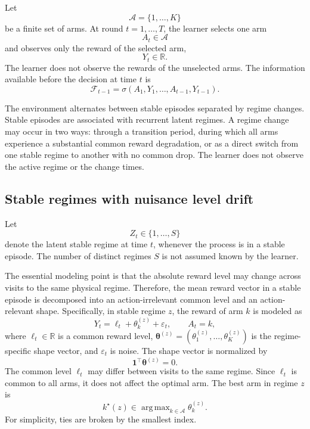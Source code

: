 \documentclass[11pt]{article}
\newcommand{\A}{\mathcal A}
\newcommand{\F}{\mathcal F}
\newcommand{\R}{\mathbb R}
\newcommand{\one}{\bm 1}
\DeclareMathOperator*{\argmax}{arg\,max}
\begin{document}
Let
\begin{equation}
\label{eq:arm_set}
\A=\{1,\ldots,K\}
\end{equation}
be a finite set of arms. At round $t=1,\ldots,T$, the learner selects one arm
\begin{equation}
\label{eq:selected_arm}
A_t\in\A
\end{equation}
and observes only the reward of the selected arm,
\begin{equation}
\label{eq:observed_reward}
Y_t\in\R .
\end{equation}
The learner does not observe the rewards of the unselected arms. The information available before the decision at time $t$ is
\begin{equation}
\label{eq:filtration}
\F_{t-1}
=
\sigma(A_1,Y_1,\ldots,A_{t-1},Y_{t-1}).
\end{equation}

The environment alternates between stable episodes separated by regime changes. Stable episodes are associated with recurrent latent regimes. A regime change may occur in two ways: through a transition period, during which all arms experience a substantial common reward degradation, or as a direct switch from one stable regime to another with no common drop. The learner does not observe the active regime or the change times.

\subsection{Stable regimes with nuisance level drift}
\label{subsec:stable_regimes}

Let
\begin{equation}
\label{eq:latent_regime}
Z_t\in\{1,\ldots,S\}
\end{equation}
denote the latent stable regime at time $t$, whenever the process is in a stable episode. The number of distinct regimes $S$ is not assumed known by the learner.

The essential modeling point is that the absolute reward level may change across visits to the same physical regime. Therefore, the mean reward vector in a stable episode is decomposed into an action-irrelevant common level and an action-relevant shape. Specifically, in stable regime $z$, the reward of arm $k$ is modeled as
\begin{equation}
\label{eq:stable_reward_model}
Y_t
=
\ell_t+\theta_k^{(z)}+\varepsilon_t,
\qquad A_t=k,
\end{equation}
where $\ell_t\in\R$ is a common reward level, $\bm\theta^{(z)}=(\theta_1^{(z)},\ldots,\theta_K^{(z)})$ is the regime-specific shape vector, and $\varepsilon_t$ is noise. The shape vector is normalized by
\begin{equation}
\label{eq:zero_sum_shape}
\one^\top \bm\theta^{(z)}=0 .
\end{equation}
The common level $\ell_t$ may differ between visits to the same regime. Since $\ell_t$ is common to all arms, it does not affect the optimal arm. The best arm in regime $z$ is
\begin{equation}
\label{eq:best_arm}
k^\star(z)
\in
\argmax_{k\in\A}\theta_k^{(z)}.
\end{equation}
For simplicity, ties are broken by the smallest index.
\end{document}
